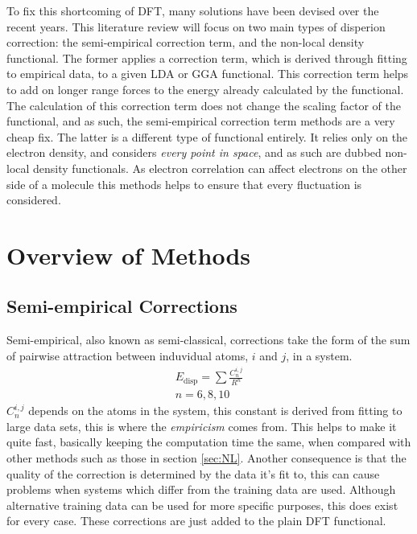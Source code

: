 \documentclass[10pt,a4paper,twocolumn,twoside]{extarticle}
\begin{document}
	To fix this shortcoming of DFT, many solutions have been devised over the recent years. This literature review will focus on two main types of disperion correction: the semi-empirical correction term, and the non-local density functional. The former applies a correction term, which is derived through fitting to empirical data, to a given LDA or GGA functional. This correction term helps to add on longer range forces to the energy already calculated by the functional. The calculation of this correction term does not change the scaling factor of the functional, and as such, the semi-empirical correction term methods are a very cheap fix. The latter is a different type of functional entirely. It relies only on the electron density, and considers \emph{every point in space}, and as such are dubbed non-local density functionals. As electron correlation can affect electrons on the other side of a molecule this methods helps to ensure that every fluctuation is considered.
	

	\section{Overview of Methods}
	\subsection{Semi-empirical Corrections}
	\label{sec:semi-empirical}
	Semi-empirical, also known as semi-classical, corrections take the form of the sum of pairwise attraction between induvidual atoms, $i$ and $j$, in a system.
	\begin{align}
		E_\text{disp} = \sum \frac{C^{i,j}_n}{R^n}\\ n = 6, 8, 10
	\end{align}
	$C^{i,j}_n$ depends on the atoms in the system, this constant is derived from fitting to large data sets, this is where the \emph{empiricism} comes from. This helps to make it quite fast, basically keeping the computation time the same, when compared with other methods such as those in section \ref{sec:NL}. Another consequence is that the quality of the correction is determined by the data it's fit to, this can cause problems when systems which differ from the training data are used. \cite{Grimme2010} Although alternative training data can be used for more specific purposes\cite{D3-ABC}, this does exist for every case. These corrections are just added to the plain DFT functional.
\end{document}
